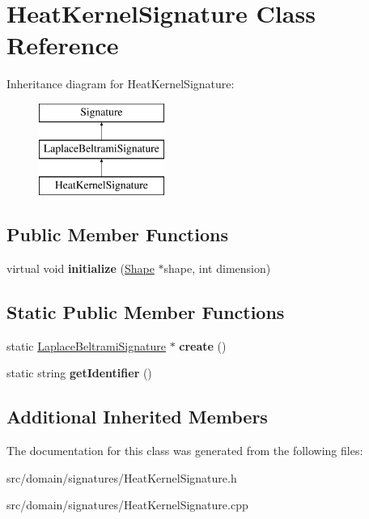 \hypertarget{class_heat_kernel_signature}{}\section{Heat\+Kernel\+Signature Class Reference}
\label{class_heat_kernel_signature}
Inheritance diagram for Heat\+Kernel\+Signature\+:\begin{figure}[H]
\begin{center}
\leavevmode
\includegraphics[height=3.000000cm]{class_heat_kernel_signature}
\end{center}
\end{figure}
\subsection*{Public Member Functions}
\begin{DoxyCompactItemize}
\item 
\hypertarget{class_heat_kernel_signature_ac21192a3ccebe61c2638991532495048}{}virtual void {\bfseries initialize} (\hyperlink{class_shape}{Shape} $\ast$shape, int dimension)\label{class_heat_kernel_signature_ac21192a3ccebe61c2638991532495048}

\end{DoxyCompactItemize}
\subsection*{Static Public Member Functions}
\begin{DoxyCompactItemize}
\item 
\hypertarget{class_heat_kernel_signature_a54d212433f1e77692b791c02576d25aa}{}static \hyperlink{class_laplace_beltrami_signature}{Laplace\+Beltrami\+Signature} $\ast$ {\bfseries create} ()\label{class_heat_kernel_signature_a54d212433f1e77692b791c02576d25aa}

\item 
\hypertarget{class_heat_kernel_signature_a3da9e323fe3c1af5d22e40d91a43c0a8}{}static string {\bfseries get\+Identifier} ()\label{class_heat_kernel_signature_a3da9e323fe3c1af5d22e40d91a43c0a8}

\end{DoxyCompactItemize}
\subsection*{Additional Inherited Members}


The documentation for this class was generated from the following files\+:\begin{DoxyCompactItemize}
\item 
src/domain/signatures/Heat\+Kernel\+Signature.\+h\item 
src/domain/signatures/Heat\+Kernel\+Signature.\+cpp\end{DoxyCompactItemize}

